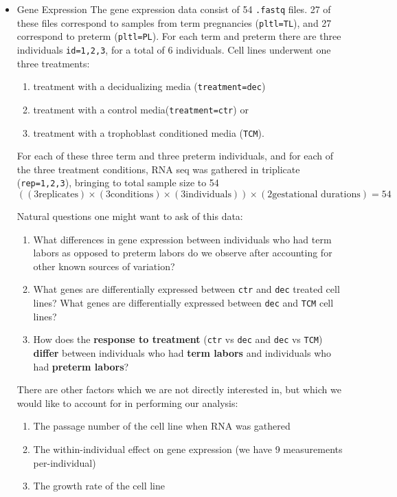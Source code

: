 \begin{itemize}
\item Gene Expression
\label{sec:orgbe0b3e5}
The gene expression data consist of 54 \texttt{.fastq} files.  27 of these files correspond to samples from term pregnancies (\texttt{pltl=TL}), and 27 correspond to preterm (\texttt{pltl=PL}).  For each term and preterm there are three 
individuals \texttt{id=1,2,3}, for a total of 6 individuals.  Cell lines underwent one three treatments:

\begin{enumerate}
\item treatment with a decidualizing media (\texttt{treatment=dec})
\item treatment with a control media(\texttt{treatment=ctr}) or
\item treatment with a trophoblast conditioned media (\texttt{TCM}).
\end{enumerate}

For each of these three term and three preterm individuals, and for each of the three treatment conditions, RNA seq was gathered in triplicate (\texttt{rep=1,2,3}), bringing to total sample size to 54 
$$ \left((3 \text{replicates}) \times (3 \text{conditions})  \times (3 \text{individuals})\right) \times (2 \text{gestational durations})=54$$

Natural questions one might want to ask of this data:

\begin{enumerate}
\item What differences in gene expression between individuals who had term labors as opposed to preterm labors do we observe after accounting for other known sources of variation?
\item What genes are differentially expressed between \texttt{ctr} and \texttt{dec} treated cell lines? What genes are differentially expressed between \texttt{dec} and \texttt{TCM} cell lines?
\item How does the \textbf{response to treatment} (\texttt{ctr} vs \texttt{dec} and \texttt{dec} vs \texttt{TCM}) \textbf{differ} between individuals who had \textbf{term labors} and individuals who had \textbf{preterm labors}?
\end{enumerate}

There are other factors which we are not directly interested in, but which we would like to account for in performing our analysis:

\begin{enumerate}
\item The passage number of the cell line when RNA was gathered
\item The within-individual effect on gene expression (we have 9 measurements per-individual)
\item The growth rate of the cell line
\end{enumerate}


\end{itemize}
